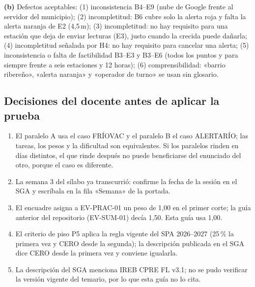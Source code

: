 \documentclass[11pt]{article}
\newcommand{\subseccion}[1]{\subsection{\textcolor{midblue}{#1}}}
\begin{document}
\textbf{(b)} Defectos aceptables: (1) inconsistencia B4--E9 (nube de Google frente al servidor del municipio); (2) incompletitud: B6 cubre solo la alerta roja y falta la alerta naranja de E2 (4,5\,m); (3) incompletitud: no hay requisito para una estación que deja de enviar lecturas (E3), justo cuando la crecida puede dañarla; (4) incompletitud señalada por H4: no hay requisito para cancelar una alerta; (5) inconsistencia o falta de factibilidad B3--E3 y B3--E6 (todos los puntos y para siempre frente a seis estaciones y 12 horas); (6) comprensibilidad: «barrio ribereño», «alerta naranja» y «operador de turno» se usan sin glosario.

\subseccion{Decisiones del docente antes de aplicar la prueba}

\begin{enumerate}[leftmargin=18pt,itemsep=2pt]
	\item El paralelo A usa el caso FRÍOVAC y el paralelo B el caso ALERTARÍO; las tareas, los pesos y la dificultad son equivalentes. Si los paralelos rinden en días distintos, el que rinde después no puede beneficiarse del enunciado del otro, porque el caso es diferente.
	\item La semana 3 del sílabo ya transcurrió: confirme la fecha de la sesión en el SGA y escríbala en la fila «Semana» de la portada.
	\item El encuadre asigna a EV-PRAC-01 un peso de 1,00 en el primer corte; la guía anterior del repositorio (EV-SUM-01) decía 1,50. Esta guía usa 1,00.
	\item El criterio de piso P5 aplica la regla vigente del SPA 2026--2027 (25\,\% la primera vez y CERO desde la segunda); la descripción publicada en el SGA dice CERO desde la primera vez y conviene igualarla.
	\item La descripción del SGA menciona IREB CPRE FL v3.1; no se pudo verificar la versión vigente del temario, por lo que esta guía no lo cita.
\end{enumerate}

\fi



\end{document}
